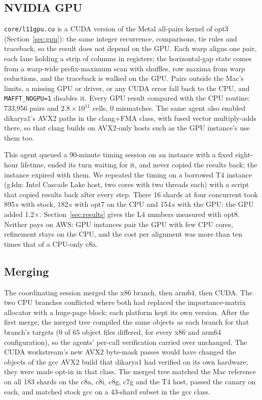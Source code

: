 \documentclass[11pt]{article}
\newcommand{\code}[1]{\texttt{#1}}
\begin{document}
\subsection{NVIDIA GPU}

\code{core/l11gpu.cu} is a CUDA version of the Metal all-pairs kernel of opt3
(Section~\ref{sec:gpu}): the same integer recurrence, comparisons, tie rules and traceback, so
the result does not depend on the GPU. Each warp aligns one pair, each lane holding a strip of
columns in registers; the horizontal-gap state comes from a warp-wide prefix-maximum scan
with shuffles, row maxima from warp reductions, and the traceback is walked on the GPU. Pairs
outside the Mac's limits, a missing GPU or driver, or any CUDA error fall back to the CPU, and
\code{MAFFT\_NOGPU=1} disables it. Every GPU result compared with the CPU routine: 733{,}956
pairs and $2.8\times10^{11}$ cells, 0 mismatches. The same agent also enabled dikarya1's AVX2
paths in the clang+FMA class, with fused vector multiply-adds there, so that clang builds on
AVX2-only hosts such as the GPU instance's use them too.

This agent queued a 90-minute timing session on an instance with a fixed eight-hour lifetime,
ended its turn waiting for it, and never copied the results back; the instance expired with
them. We repeated the timing on a borrowed T4 instance (g4dn: Intel Cascade Lake host, two
cores with two threads each) with a script that copied results back after every step. There
16 shards at four concurrent took 895\,s with stock, 182\,s with opt7 on the CPU and 154\,s with
the GPU: the GPU added 1.2$\times$. Section~\ref{sec:results} gives the L4 numbers measured with
opt8. Neither pays on AWS: GPU instances pair the GPU with few CPU cores, refinement stays on
the CPU, and the cost per alignment was more than ten times that of a CPU-only c8a.

\subsection{Merging}

The coordinating session merged the x86 branch, then arm64, then CUDA. The two CPU branches
conflicted where both had replaced the importance-matrix allocator with a huge-page block; each
platform kept its own version. After the first merge, the merged tree compiled the same objects
as each branch for that branch's targets (0 of 65 object files differed, for every x86 and arm64
configuration), so the agents' per-call verification carried over unchanged. The CUDA
workstream's new AVX2 byte-mask passes would have changed the objects of the gcc AVX2 build that
dikarya1 had verified on its own hardware; they were made opt-in in that class. The merged tree
matched the Mac reference on all 183 shards on the c8a, c8i, c8g, c7g and the T4 host, passed the
canary on each, and matched stock gcc on a 43-shard subset in the gcc class.
\end{document}
